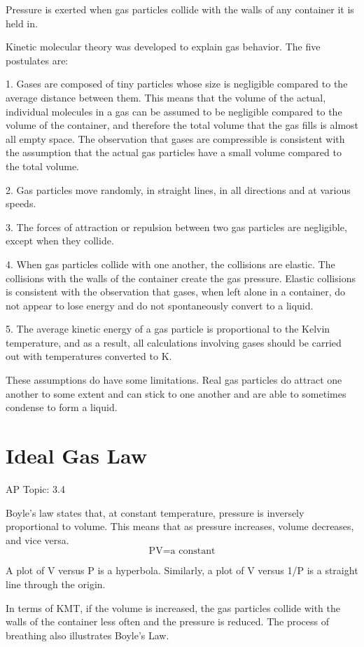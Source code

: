 \documentclass[../chem.tex]{subfiles}
\begin{document}
Pressure is exerted when gas particles collide with the walls of any container it is held in.

Kinetic molecular theory was developed to explain gas behavior. The five postulates are:

1. Gases are composed of tiny particles whose size is negligible compared to the average distance between them. This means that the volume of the actual, 
individual molecules in a gas can be assumed to be negligible compared to the volume of the container, and therefore the total volume that the gas fills is almost 
all empty space. The observation that gases are compressible is consistent with the assumption that the actual gas particles have a small volume compared to the total volume.

2. Gas particles move randomly, in straight lines, in all directions and at various speeds.

3. The forces of attraction or repulsion between two gas particles are negligible, except when they collide.

4. When gas particles collide with one another, the collisions are elastic. The collisions with the walls of the container create the gas pressure.
Elastic collisions is consistent with the observation that gases, when left alone in a container, do not appear to lose energy and do not spontaneously 
convert to a liquid.

5. The average kinetic energy of a gas particle is proportional to the Kelvin temperature, and as a result, all calculations involving gases should be carried out with temperatures converted to K.

These assumptions do have some limitations. Real gas particles do attract one another to some extent and can stick to one another and are able to sometimes condense to form a liquid.

\section{Ideal Gas Law}
AP Topic: 3.4

Boyle's law states that, at constant temperature, pressure is inversely proportional to volume. This means that as pressure increases, volume decreases, and vice versa.
\[ \text{PV} = \text{a constant}\]  

A plot of V versus P is a hyperbola. Similarly, a plot of V versus 1/P is a straight line through the origin.

In terms of KMT, if the volume is increased, the gas particles collide with the walls of the container less often and the pressure is reduced. The process of breathing also illustrates Boyle's Law.
\end{document}
